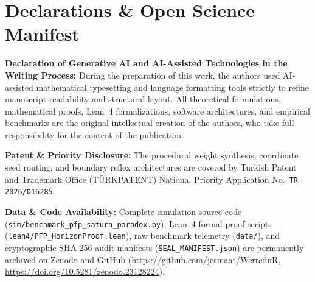 \documentclass[10pt,twocolumn,a4paper]{article}
\begin{document}
\section*{Declarations \& Open Science Manifest}
\noindent \textbf{Declaration of Generative AI and AI-Assisted Technologies in the Writing Process:} During the preparation of this work, the authors used AI-assisted mathematical typesetting and language formatting tools strictly to refine manuscript readability and structural layout. All theoretical formulations, mathematical proofs, Lean~4 formalizations, software architectures, and empirical benchmarks are the original intellectual creation of the authors, who take full responsibility for the content of the publication. \par\vspace{4pt}
\noindent \textbf{Patent \& Priority Disclosure:} The procedural weight synthesis, coordinate seed routing, and boundary reflex architectures are covered by Turkish Patent and Trademark Office (T\"URKPATENT) National Priority Application No.\ \texttt{TR 2026/016285}. \par\vspace{4pt}
\noindent \textbf{Data \& Code Availability:} Complete simulation source code (\texttt{sim/benchmark\_pfp\_saturn\_paradox.py}), Lean~4 formal proof scripts (\texttt{lean4/PFP\_HorizonProof.lean}), raw benchmark telemetry (\texttt{data/}), and cryptographic SHA-256 audit manifests (\texttt{SEAL\_MANIFEST.json}) are permanently archived on Zenodo and GitHub (\url{https://github.com/jesmaat/WerreduR}, \url{https://doi.org/10.5281/zenodo.23128224}).
\end{document}
